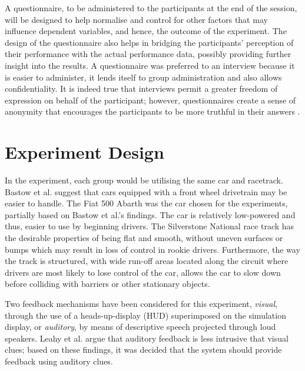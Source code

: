 A questionnaire, to be administered to the participants at the end of the session, will be designed to help normalise and control for other factors that may influence dependent variables, and hence, the outcome of the experiment. The design of the questionnaire also helps in bridging the participants' perception of their performance with the actual performance data, possibly providing further insight into the results. A questionnaire was preferred to an interview because it is easier to administer, it lends itself to group administration and also allows confidentiality. It is indeed true that interviews permit a greater freedom of expression on behalf of the participant; however, questionnaires create a sense of anonymity that encourages the participants to be more truthful in their answers \cite{introductiontobehavioralresearchmethods}.

\section{Experiment Design}
\label{sec:meth-experiment-design}
In the experiment, each group would be utilising the same car and racetrack. Bastow et al. \cite{bastow2004car} suggest that cars equipped with a front wheel drivetrain may be easier to handle. The Fiat 500 Abarth was the car chosen for the experiments, partially based on Bastow et al.'s findings. The car is relatively low-powered and thus, easier to use by beginning drivers. The Silverstone National race track has the desirable properties of being flat and smooth, without uneven surfaces or bumps which may result in loss of control in rookie drivers. Furthermore, the way the track is structured, with wide run-off areas located along the circuit where drivers are most likely to lose control of the car, allows the car to slow down before colliding with barriers or other stationary objects.

Two feedback mechanisms have been considered for this experiment, \emph{visual}, through the use of a heads-up-display (HUD) superimposed on the simulation display, or \emph{auditory}, by means of descriptive speech projected through loud speakers. Leahy et al. \cite{leahy2003auditory} argue that auditory feedback is less intrusive that visual clues; based on these findings, it was decided that the system should provide feedback using auditory clues.


